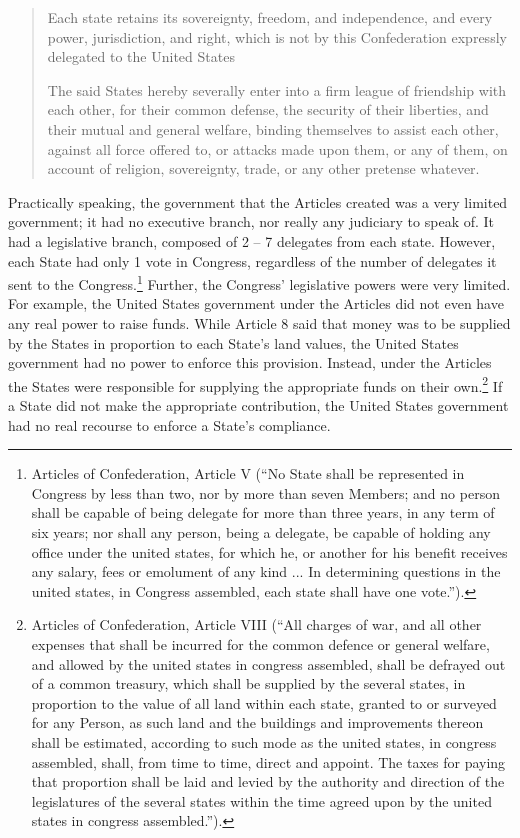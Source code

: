 \begin{quote}
Each state retains its sovereignty, freedom, and independence, and every power, jurisdiction, and right, which is not by this Confederation expressly delegated to the United States

The said States hereby severally enter into a firm league of friendship with each other, for their common defense, the security of their liberties, and their mutual and general welfare, binding themselves to assist each other, against all force offered to, or attacks made upon them, or any of them, on account of religion, sovereignty, trade, or any other pretense whatever.
\end{quote}

Practically speaking, the government that the Articles created was a very limited government; it had no executive branch, nor really any judiciary to speak of.  It had a legislative branch, composed of 2 -- 7 delegates from each state.  However, each State had only 1 vote in Congress, regardless of the number of delegates it sent to the Congress.\footnote{Articles of Confederation, Article V (``No State shall be represented in Congress by less than two, nor by more than seven Members; and no person shall be capable of being delegate for more than three years, in any term of six years; nor shall any person, being a delegate, be capable of holding any office under the united states, for which he, or another for his benefit receives any salary, fees or emolument of any kind ...    In determining questions in the united states, in Congress assembled, each state shall have one vote.'').}  Further, the Congress' legislative powers were very limited.  For example, the United States government under the Articles did not even have any real power to raise funds.  While Article 8 said that money was to be supplied by the States in proportion to each State's land values, the United States government had no power to enforce this provision.  Instead, under the Articles the States were responsible for supplying the appropriate funds on their own.\footnote{Articles of Confederation, Article VIII (``All charges of war, and all other expenses that shall be incurred for the common defence or general welfare, and allowed by the united states in congress assembled, shall be defrayed out of a common treasury, which shall be supplied by the several states, in proportion to the value of all land within each state, granted to or surveyed for any Person, as such land and the buildings  and improvements thereon shall be estimated, according to such mode as the united states, in congress assembled, shall, from time to time, direct and appoint. The taxes for paying that proportion shall be laid and levied by the authority and direction of the legislatures of the several states within the time agreed upon by the united states in congress assembled.'').}  If a State did not make the appropriate contribution, the United States government had no real recourse to enforce a State's compliance.

